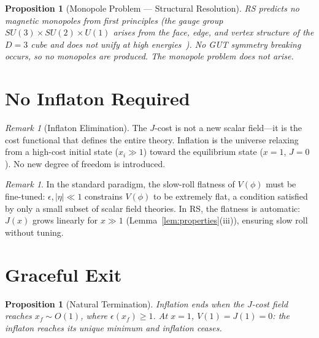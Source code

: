 \documentclass[12pt,a4paper]{article}
\newtheorem{proposition}[theorem]{Proposition}
\theoremstyle{definition}
\theoremstyle{remark}
\newtheorem{remark}[theorem]{Remark}
\begin{document}
\begin{proposition}[Monopole Problem --- Structural Resolution]
RS predicts no magnetic monopoles from first principles
(the gauge group $SU(3) \times SU(2) \times U(1)$
arises from the face, edge, and vertex structure of the
$D = 3$ cube and does not unify at high
energies~\cite{RSGauge}).  No GUT symmetry breaking
occurs, so no monopoles are produced.  The monopole
problem does not arise.
\end{proposition}

\section{No Inflaton Required}
\label{sec:no-inflaton}

\begin{remark}[Inflaton Elimination]
\label{rem:elimination}
The $J$-cost is not a new scalar field---it is the cost
functional that defines the entire theory.  Inflation is
the universe relaxing from a high-cost initial state
($x_i \gg 1$) toward the equilibrium state ($x = 1$,
$J = 0$).  No new degree of freedom is introduced.
\end{remark}

\begin{remark}
In the standard paradigm, the slow-roll flatness of
$V(\phi)$ must be fine-tuned: $\epsilon, |\eta| \ll 1$
constrains $V(\phi)$ to be extremely flat, a condition
satisfied by only a small subset of scalar field
theories.  In RS, the flatness is automatic: $J(x)$
grows linearly for $x \gg 1$
(Lemma~\ref{lem:properties}(iii)), ensuring slow roll
without tuning.
\end{remark}

\section{Graceful Exit}
\label{sec:exit}

\begin{proposition}[Natural Termination]
\label{thm:exit}
Inflation ends when the $J$-cost field reaches
$x_f \sim O(1)$, where $\epsilon(x_f) \geq 1$.  At
$x = 1$, $V(1) = J(1) = 0$: the inflaton reaches
its unique minimum and inflation ceases.
\end{proposition}
\end{document}
